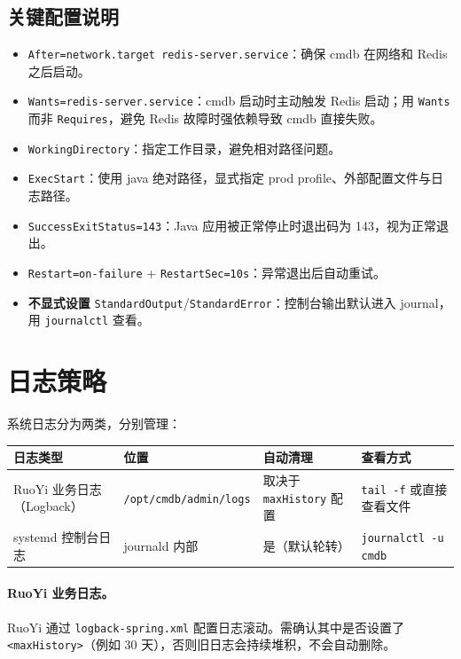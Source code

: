 \documentclass[12pt,a4paper]{ctexart}
\begin{document}
\subsection{关键配置说明}

\begin{itemize}[leftmargin=2em]
  \item \texttt{After=network.target redis-server.service}：确保 cmdb 在网络和 Redis 之后启动。
  \item \texttt{Wants=redis-server.service}：cmdb 启动时主动触发 Redis 启动；用 \texttt{Wants} 而非 \texttt{Requires}，避免 Redis 故障时强依赖导致 cmdb 直接失败。
  \item \texttt{WorkingDirectory}：指定工作目录，避免相对路径问题。
  \item \texttt{ExecStart}：使用 java 绝对路径，显式指定 prod profile、外部配置文件与日志路径。
  \item \texttt{SuccessExitStatus=143}：Java 应用被正常停止时退出码为 143，视为正常退出。
  \item \texttt{Restart=on-failure} + \texttt{RestartSec=10s}：异常退出后自动重试。
  \item \textbf{不显式设置} \texttt{StandardOutput}/\texttt{StandardError}：控制台输出默认进入 journal，用 \texttt{journalctl} 查看。
\end{itemize}

\section{日志策略}

系统日志分为两类，分别管理：

\begin{table}[h]
\centering
\begin{tabular}{@{}p{3.2cm}p{4.2cm}p{2.6cm}p{3.5cm}@{}}
\toprule
日志类型 & 位置 & 自动清理 & 查看方式 \\
\midrule
RuoYi 业务日志（Logback） & \texttt{/opt/cmdb/admin/logs} & 取决于 \texttt{maxHistory} 配置 & \texttt{tail -f} 或直接查看文件 \\
systemd 控制台日志 & journald 内部 & 是（默认轮转） & \texttt{journalctl -u cmdb} \\
\bottomrule
\end{tabular}
\end{table}

\paragraph{RuoYi 业务日志。}
RuoYi 通过 \texttt{logback-spring.xml} 配置日志滚动。需确认其中是否设置了 \texttt{<maxHistory>}（例如 30 天），否则旧日志会持续堆积，不会自动删除。
\end{document}
